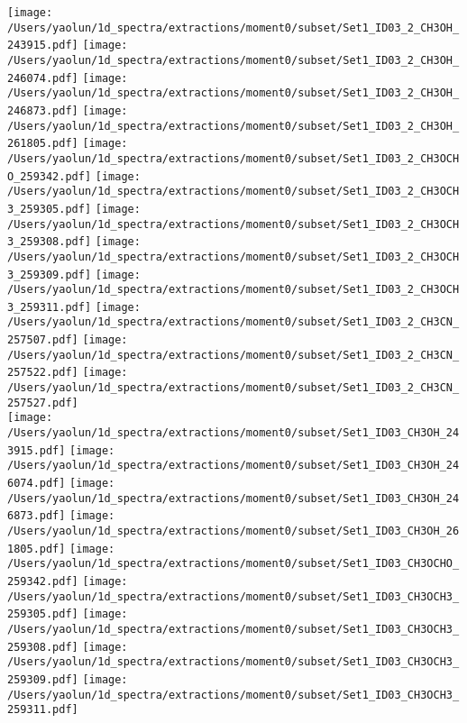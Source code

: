 \begin{figure*}[htbp!]
  \centering
  \texttt{[image: /Users/yaolun/1d\_spectra/extractions/moment0/subset/Set1\_ID03\_2\_CH3OH\_243915.pdf]}
  \texttt{[image: /Users/yaolun/1d\_spectra/extractions/moment0/subset/Set1\_ID03\_2\_CH3OH\_246074.pdf]}
  \texttt{[image: /Users/yaolun/1d\_spectra/extractions/moment0/subset/Set1\_ID03\_2\_CH3OH\_246873.pdf]}
  \texttt{[image: /Users/yaolun/1d\_spectra/extractions/moment0/subset/Set1\_ID03\_2\_CH3OH\_261805.pdf]}
  \texttt{[image: /Users/yaolun/1d\_spectra/extractions/moment0/subset/Set1\_ID03\_2\_CH3OCHO\_259342.pdf]}
  \texttt{[image: /Users/yaolun/1d\_spectra/extractions/moment0/subset/Set1\_ID03\_2\_CH3OCH3\_259305.pdf]}
  \texttt{[image: /Users/yaolun/1d\_spectra/extractions/moment0/subset/Set1\_ID03\_2\_CH3OCH3\_259308.pdf]}
  \texttt{[image: /Users/yaolun/1d\_spectra/extractions/moment0/subset/Set1\_ID03\_2\_CH3OCH3\_259309.pdf]}
  \texttt{[image: /Users/yaolun/1d\_spectra/extractions/moment0/subset/Set1\_ID03\_2\_CH3OCH3\_259311.pdf]}
  \texttt{[image: /Users/yaolun/1d\_spectra/extractions/moment0/subset/Set1\_ID03\_2\_CH3CN\_257507.pdf]}
  \texttt{[image: /Users/yaolun/1d\_spectra/extractions/moment0/subset/Set1\_ID03\_2\_CH3CN\_257522.pdf]}
  \texttt{[image: /Users/yaolun/1d\_spectra/extractions/moment0/subset/Set1\_ID03\_2\_CH3CN\_257527.pdf]}
  \\
  \texttt{[image: /Users/yaolun/1d\_spectra/extractions/moment0/subset/Set1\_ID03\_CH3OH\_243915.pdf]}
  \texttt{[image: /Users/yaolun/1d\_spectra/extractions/moment0/subset/Set1\_ID03\_CH3OH\_246074.pdf]}
  \texttt{[image: /Users/yaolun/1d\_spectra/extractions/moment0/subset/Set1\_ID03\_CH3OH\_246873.pdf]}
  \texttt{[image: /Users/yaolun/1d\_spectra/extractions/moment0/subset/Set1\_ID03\_CH3OH\_261805.pdf]}
  \texttt{[image: /Users/yaolun/1d\_spectra/extractions/moment0/subset/Set1\_ID03\_CH3OCHO\_259342.pdf]}
  \texttt{[image: /Users/yaolun/1d\_spectra/extractions/moment0/subset/Set1\_ID03\_CH3OCH3\_259305.pdf]}
  \texttt{[image: /Users/yaolun/1d\_spectra/extractions/moment0/subset/Set1\_ID03\_CH3OCH3\_259308.pdf]}
  \texttt{[image: /Users/yaolun/1d\_spectra/extractions/moment0/subset/Set1\_ID03\_CH3OCH3\_259309.pdf]}
  \texttt{[image: /Users/yaolun/1d\_spectra/extractions/moment0/subset/Set1\_ID03\_CH3OCH3\_259311.pdf]}

\end{figure*}
